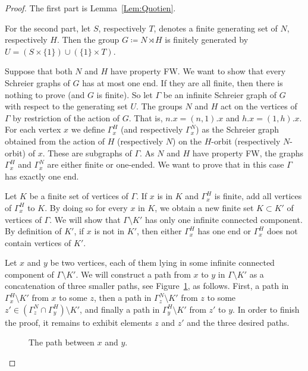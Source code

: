 \begin{proof}
The first part is Lemma~\ref{Lem:Quotien}.

For the second part, let $S$, respectively $T$, denotes a finite generating set of $N$, respectively $H$.
Then the group $G\coloneqq N\rtimes H$ is finitely generated by $U=(S\times\{1\}) \cup(\{1\}\times T)$.


Suppose that both $N$ and $H$ have property FW. We want to show that every Schreier graphs of $G$ has at most one end. If they are all finite, then there is nothing to prove (and $G$ is finite). So let $\Gamma$ be an infinite Schreier graph of $G$ with respect to the generating set $U$. The groups $N$ and $H$ act on the vertices of $\Gamma$ by restriction of the action of $G$. That is, $n.x = (n,1).x$ and $h.x = (1,h).x$.
For each vertex $x$ we define $\Gamma_x^H$ (and respectively $\Gamma_x^N$) as the Schreier graph obtained from the action of $H$ (respectively $N$) on the $H$-orbit (respectively $N$-orbit) of $x$. These are subgraphs of $\Gamma$. As $N$ and $H$ have property FW, the graphs $\Gamma_x^H$ and $\Gamma_x^N$ are either finite or one-ended. We want to prove that in this case $\Gamma$ has exactly one end.

Let $K$ be a finite set of vertices of $\Gamma$.
If $x$ is in $K$ and $\Gamma_x^H$ is finite, add all vertices of $\Gamma_x^H$ to $K$.
By doing so for every $x$ in $K$, we obtain a new finite set $K\subset K'$ of vertices of $\Gamma$.
We will show that $\Gamma\setminus K'$ has only one infinite connected component.
By definition of $K'$, if $x$ is not in $K'$, then either $\Gamma_x^H$ has one end or $\Gamma_x^H$ does not contain vertices of $K'$.

Let $x$ and $y$ be two vertices, each of them lying in some infinite connected component of $\Gamma\setminus K'$.
We will construct a path from $x$ to $y$ in $\Gamma\setminus K'$ as a concatenation of three smaller paths, see Figure~\ref{Figure:PathSemiDirect}, as follows.
First, a path in $\Gamma_x^H\setminus K'$ from $x$ to some $z$, then a path in $\Gamma_z^N\setminus K'$ from $z$ to some $z'\in (\Gamma_z^N\cap \Gamma_y^H)\setminus K'$, and finally a path in $\Gamma_y^H\setminus K'$ from $z'$ to $y$.
In order to finish the proof, it remains to exhibit elements $z$ and $z'$ and the three desired paths.
%
%
\begin{figure}[htbp]\centering
\scalebox{01}{
}
\caption{The path between $x$ and $y$.}
\label{Figure:PathSemiDirect}
\end{figure}
%
%


\end{proof}
